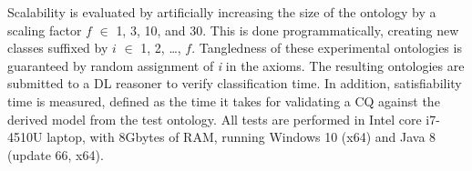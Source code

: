  
Scalability is evaluated by artificially increasing the size of the ontology by a scaling factor $f$ $\in$ {1, 3, 10, and 30}. This is done programmatically, creating new classes suffixed by $i$ $\in$ {1, 2, \ldots, $f$}. Tangledness of these experimental ontologies is guaranteed by random assignment of \textit{i} in the axioms.  
The resulting ontologies are submitted to a DL reasoner to verify classification time. In addition, 
satisfiability time is measured, defined as the time it takes for validating a CQ 
against the derived model from the test ontology.
All tests are performed in Intel core i7-4510U laptop, with 8Gbytes of RAM, running Windows 10 (x64) and Java 8 (update 66, x64).
